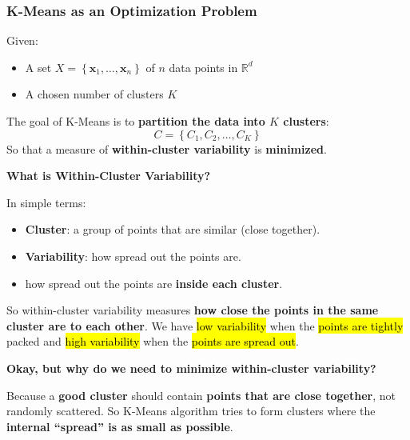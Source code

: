 \subsubsection{K-Means as an Optimization Problem}

Given:
\begin{itemize}
    \item A set $X = \left\{\mathbf{x}_{1}, \dots, \mathbf{x}_{n}\right\}$ of $n$ data points in $\mathbb{R}^{d}$
    \item A chosen number of clusters $K$
\end{itemize}
The goal of K-Means is to \textbf{partition the data into $K$ clusters}:
\begin{equation*}
    C = \left\{C_{1}, C_{2}, \dots, C_{K}\right\}   
\end{equation*}
So that a measure of \textbf{within-cluster variability} is \textbf{minimized}.

\highspace
\begin{flushleft}\label{def: within-cluster variability}
    \textcolor{Green3}{ \textbf{What is Within-Cluster Variability?}}
\end{flushleft}
In simple terms:
\begin{itemize}
    \item \textbf{Cluster}: a group of points that are similar (close together).
    \item \textbf{Variability}: how spread out the points are.
    \item {} how spread out the points are \textbf{inside each cluster}.
\end{itemize}
So within-cluster variability measures \textbf{how close the points in the same cluster are to each other}. We have \hl{low variability} when the \hl{points are tightly} packed and \hl{high variability} when the \hl{points are spread out}.

\highspace
\begin{flushleft}
    \textcolor{Green3}{ \textbf{Okay, but why do we need to minimize within-cluster variability?}}
\end{flushleft}
Because a \textbf{good cluster} should contain \textbf{points that are close together}, not randomly scattered. So K-Means algorithm tries to form clusters where the \textbf{internal ``spread'' is as small as possible}.

